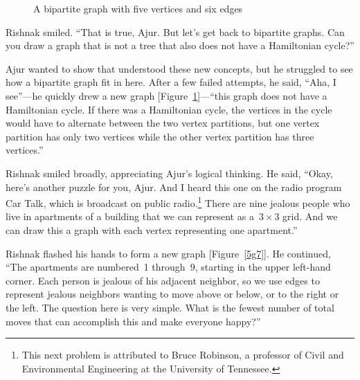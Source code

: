 \begin{figure}
\begin{center}
\caption{A bipartite graph with five vertices and six edges}\label{5g6}
\end{center}
\end{figure}

Rishnak smiled.  ``That is true, Ajur. But let's get back to bipartite graphs. Can you draw a graph that is not a tree that also does not have a Hamiltonian cycle?''

Ajur wanted to show that understood these new concepts, but he struggled to see how a bipartite graph fit in here. After a few failed attempts, he said, ``Aha, I see''---he quickly drew a new graph [Figure~\ref{5g6}]---``this graph does not have a Hamiltonian cycle. If there was a Hamiltonian cycle, the vertices in the cycle would have to alternate between the two vertex partitions, but one vertex partition has only two vertices while the other vertex partition has three vertices.''

Rishnak smiled broadly, appreciating Ajur's logical thinking.  He said, ``Okay, here's another puzzle for you, Ajur. And I heard this one on the radio program Car Talk, which is broadcast on public radio.\footnote{This next problem is attributed to Bruce Robinson, a professor of Civil and Environmental Engineering at the University of Tennessee.} There are nine jealous people who live in apartments of a building that we can represent as a~$3\times3$ grid. And we can draw this a graph with each vertex representing one apartment.''

Rishnak flashed his hands to form a new graph [Figure~\ref{5g7}]. He continued, ``The apartments are numbered~1 through~9, starting in the upper left-hand corner. Each person is jealous of his adjacent neighbor, so we use edges to represent jealous neighbors wanting to move above or below, or to the right or the left. The question here is very simple. What is the fewest number of total moves that can accomplish this and make everyone happy?''

